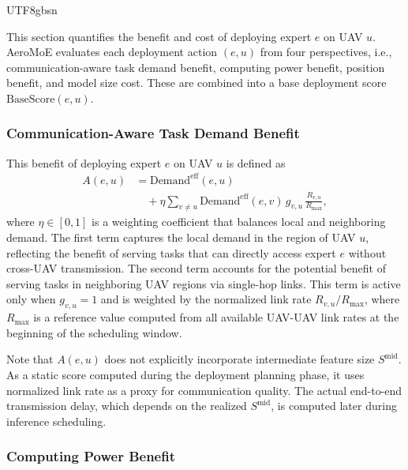\documentclass[journal]{IEEEtran}
\begin{document}
\begin{CJK*}{UTF8}{gbsn}

This section quantifies the benefit and cost of deploying expert \(e\) on UAV \(u\). AeroMoE evaluates each deployment action \((e, u)\) from four perspectives, i.e., communication-aware task demand benefit, computing power benefit, position benefit, and model size cost. These are combined into a base deployment score \(\mathrm{BaseScore}(e, u)\).

\subsubsection{Communication-Aware Task Demand Benefit}

This benefit of deploying expert \(e\) on UAV \(u\) is defined as
\begin{equation}
\begin{aligned}
A(e, u) &= \mathrm{Demand}^{\mathrm{eff}}(e, u) \\
&\quad + \eta \sum_{v \neq u} \mathrm{Demand}^{\mathrm{eff}}(e, v) \, g_{v, u} \, \frac{R_{v, u}}{R_{\max}},
\end{aligned}
\label{eq:A}
\end{equation}
where \(\eta \in [0, 1]\) is a weighting coefficient that balances local and neighboring demand. The first term captures the local demand in the region of UAV \(u\), reflecting the benefit of serving tasks that can directly access expert \(e\) without cross-UAV transmission. The second term accounts for the potential benefit of serving tasks in neighboring UAV regions via single-hop links. This term is active only when \(g_{v, u} = 1\) and is weighted by the normalized link rate \(R_{v, u}/R_{\max}\), where \(R_{\max}\) is a reference value computed from all available UAV-UAV link rates at the beginning of the scheduling window.

Note that \(A(e, u)\) does not explicitly incorporate intermediate feature size \(S^{\mathrm{mid}}\). As a static score computed during the deployment planning phase, it uses normalized link rate as a proxy for communication quality. The actual end-to-end transmission delay, which depends on the realized \(S^{\mathrm{mid}}\), is computed later during inference scheduling.

\subsubsection{Computing Power Benefit}


\end{CJK*}
\end{document}
